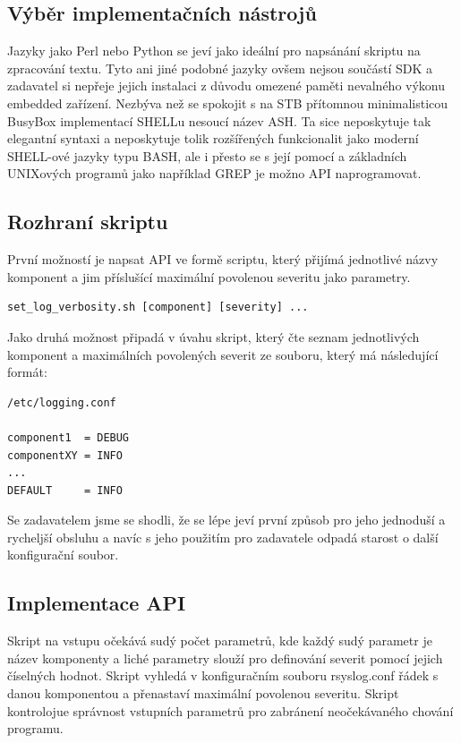 \documentclass[thesis=B,czech]{FITthesis}[2012/06/26]
\begin{document}
\subsection{Výběr implementačních nástrojů}
Jazyky jako Perl nebo Python se jeví jako ideální pro napsánání skriptu na zpracování textu. Tyto ani jiné podobné jazyky ovšem nejsou součástí SDK a zadavatel si nepřeje jejich instalaci z důvodu omezené paměti nevalného výkonu embedded zařízení. Nezbýva než se spokojit s na STB přítomnou minimalisticou BusyBox implementací SHELLu nesoucí název ASH. Ta sice neposkytuje tak elegantní syntaxi a neposkytuje tolik rozšířených funkcionalit jako moderní SHELL-ové jazyky typu BASH, ale i přesto se s její pomocí a základních UNIXových programů jako například GREP je možno API naprogramovat.

\subsection{Rozhraní skriptu}
První možností je napsat API ve formě scriptu, který přijímá jednotlivé názvy komponent a jim příslušící maximální povolenou severitu jako parametry.

\begin{lstlisting}
set_log_verbosity.sh [component] [severity] ...
\end{lstlisting}

Jako druhá možnost připadá v úvahu skript, který čte seznam jednotlivých komponent a maximálních povolených severit ze souboru, který má následující formát:

\begin{lstlisting}
/etc/logging.conf

component1  = DEBUG
componentXY = INFO
...
DEFAULT     = INFO
\end{lstlisting}

Se zadavatelem jsme se shodli, že se lépe jeví první způsob pro jeho jednoduší a rycheljší obsluhu a navíc s jeho použitím pro zadavatele odpadá starost o další konfigurační soubor.

\subsection{Implementace API}
Skript na vstupu očekává sudý počet parametrů, kde každý sudý parametr je název komponenty a liché parametry slouží pro definování severit pomocí jejich číselných hodnot.
Skript vyhledá v konfiguračním souboru rsyslog.conf řádek s danou komponentou a přenastaví maximální povolenou severitu. Skript kontrolojue správnost vstupních parametrů pro zabránení neočekávaného chování programu.
\end{document}
